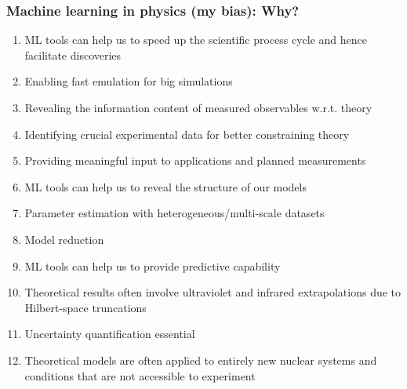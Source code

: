 \documentclass{beamer}
\begin{document}
\begin{frame}
\frametitle{Machine learning in physics  (my bias): Why?}

\begin{enumerate}
\item ML tools can help us to speed up the scientific process cycle and hence facilitate discoveries

\item Enabling fast emulation for big simulations

\item Revealing the information content of measured observables w.r.t. theory

\item Identifying crucial experimental data for better constraining theory

\item Providing meaningful input to applications and planned measurements

\item ML tools can help us to reveal the structure of our models

\item Parameter estimation with heterogeneous/multi-scale datasets

\item Model reduction

\item ML tools can help us to provide predictive capability

\item Theoretical results often involve ultraviolet  and infrared extrapolations due to Hilbert-space truncations 

\item Uncertainty quantification essential

\item Theoretical models are often applied to entirely new nuclear systems and conditions that are not accessible to experiment
\end{enumerate}

\noindent
\end{frame}
\end{document}
